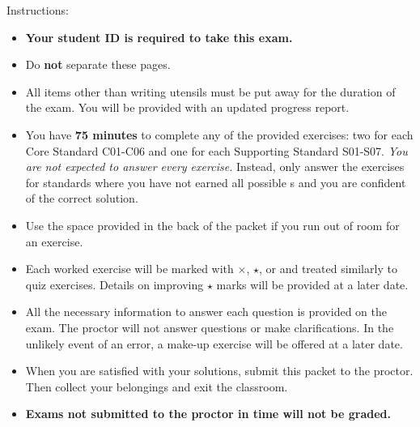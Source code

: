 \documentclass[12pt]{article}
\newcommand{\<}{\left\langle}
\renewcommand{\>}{\right\rangle}
\begin{document}

\vspace{1em}

Instructions:

\begin{itemize}
  \item \textbf{Your student ID is required to take this exam.}
  \item Do \textbf{not} separate these pages.
  \item All items other than writing utensils must be put away for the duration
        of the exam. You will be provided with an updated progress report.
  \item You have \textbf{75 minutes} to complete any of the provided exercises:
        two for each Core Standard C01-C06 and one for each Supporting Standard
        S01-S07.
        \textit{You are
        not expected to answer every exercise.} Instead, only answer the
        exercises for standards where you have not earned all possible
        \checkmark{}s and you are confident of the correct solution.
  \item Use the space provided in the back of the packet if you run out
        of room for an exercise.
  \item Each worked exercise will be marked with \(\times\), \(\star\), or
        \checkmark{} and treated similarly to quiz exercises. Details on
        improving \(\star\) marks will be provided at a later date.
  \item All the necessary information to answer each question is provided
        on the exam.
        The proctor will not answer questions or make clarifications.
        In the unlikely event of an error, a make-up exercise will be
        offered at a later date.
  \item When you are satisfied with your solutions, submit this packet to
        the proctor. Then collect your belongings and exit the classroom.
  \item \textbf{Exams not submitted to the proctor in time will not be
        graded.}
\end{itemize}
\end{document}

